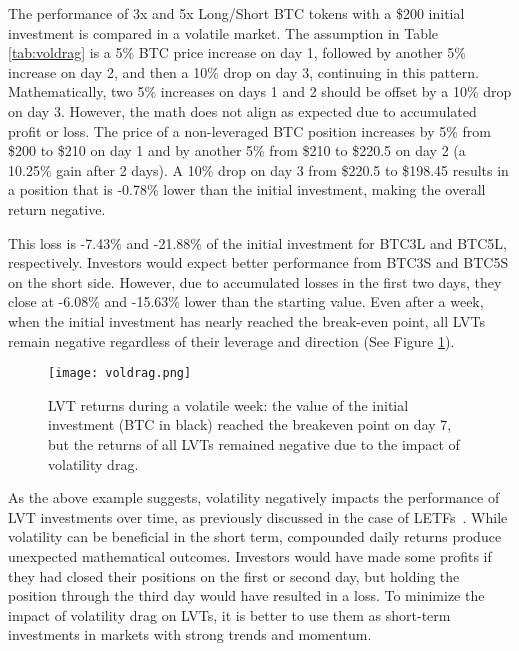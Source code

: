 \begin{example}
	The performance of 3x and 5x Long/Short BTC tokens with a \$200 initial investment is compared in a volatile market. The assumption in Table \ref{tab:voldrag} is a 5\% BTC price increase on day 1, followed by another 5\% increase on day 2, and then a 10\% drop on day 3, continuing in this pattern. Mathematically, two 5\% increases on days 1 and 2 should be offset by a 10\% drop on day 3. However, the math does not align as expected due to accumulated profit or loss. The price of a non-leveraged BTC position increases by 5\% from \$200 to \$210 on day 1 and by another 5\% from \$210 to \$220.5 on day 2 (a 10.25\% gain after 2 days). A 10\% drop on day 3 from \$220.5 to \$198.45 results in a position that is -0.78\% lower than the initial investment, making the overall return negative. 
	
	This loss is -7.43\% and -21.88\% of the initial investment for BTC3L and BTC5L, respectively. Investors would expect better performance from BTC3S and BTC5S on the short side. However, due to accumulated losses in the first two days, they close at -6.08\% and -15.63\% lower than the starting value. Even after a week, when the initial investment has nearly reached the break-even point, all LVTs remain negative regardless of their leverage and direction (See Figure \ref{fig:voldrag}).
	
	\begin{figure}[t]
		\centering
		\texttt{[image: voldrag.png]}
		\caption[Volatility drag effect in volatile market]{LVT returns during a volatile week: the value of the initial investment (BTC in black) reached the breakeven point on day 7, but the returns of all LVTs remained negative due to the impact of volatility drag.}
		\label{fig:voldrag}
	\end{figure}
\end{example}

As the above example suggests, volatility negatively impacts the performance of LVT investments over time, as previously discussed in the case of LETFs~\cite{giese2010performance, trainor2011daily}. While volatility can be beneficial in the short term, compounded daily returns produce unexpected mathematical outcomes. Investors would have made some profits if they had closed their positions on the first or second day, but holding the position through the third day would have resulted in a loss. To minimize the impact of volatility drag on LVTs, it is better to use them as short-term investments in markets with strong trends and momentum.

